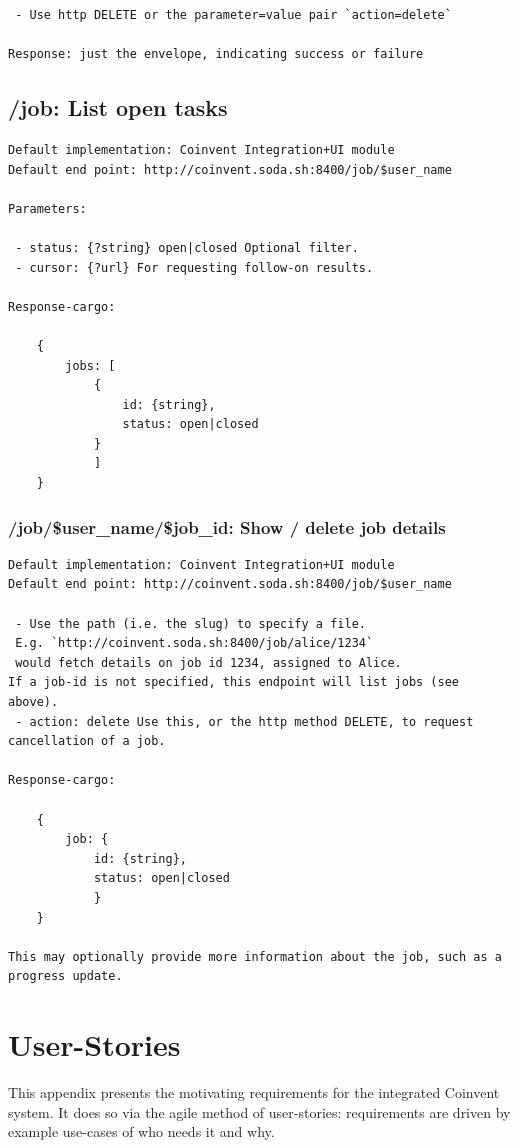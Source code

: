\documentclass[10pt]{article}
\begin{document}
\begin{appendices}
\begin{verbatim}
 - Use http DELETE or the parameter=value pair `action=delete`

Response: just the envelope, indicating success or failure 
 \end{verbatim}
\subsection{/job: List open tasks}
\begin{verbatim}
Default implementation: Coinvent Integration+UI module      
Default end point: http://coinvent.soda.sh:8400/job/$user_name

Parameters:

 - status: {?string} open|closed Optional filter.
 - cursor: {?url} For requesting follow-on results.
   
Response-cargo: 
	
	{
		jobs: [
			{
				id: {string},   
				status: open|closed
			}
			] 
	}
\end{verbatim}
\subsubsection{/job/\$user\_name/\$job\_id: Show / delete job details}
\begin{verbatim}
Default implementation: Coinvent Integration+UI module      
Default end point: http://coinvent.soda.sh:8400/job/$user_name

 - Use the path (i.e. the slug) to specify a file.   
 E.g. `http://coinvent.soda.sh:8400/job/alice/1234`
 would fetch details on job id 1234, assigned to Alice.
If a job-id is not specified, this endpoint will list jobs (see above).
 - action: delete Use this, or the http method DELETE, to request cancellation of a job.

Response-cargo: 
	
	{
		job: {
			id: {string},
			status: open|closed
			} 
	}

This may optionally provide more information about the job, such as a progress update.
\end{verbatim}


\section{User-Stories}

This appendix presents the motivating requirements for the integrated Coinvent system. It does so via the agile method of user-stories: requirements are driven by example use-cases of who needs it and why.


\end{appendices}
\end{document}
